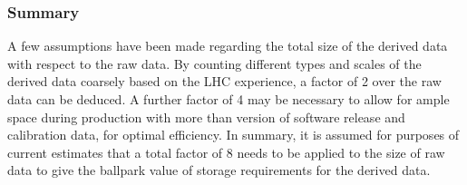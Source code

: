 \subsubsection{Summary}
\label{sec:derived-data-factor}
A few assumptions have been made regarding the total size of the derived data with respect to the raw data. By counting
different types and scales of the derived data coarsely based on the LHC experience, a factor of 2 over the raw data can
be deduced. A further factor of 4 may be necessary to allow for ample space during production with more than version
of software release and calibration data, for optimal efficiency. In summary, it is assumed for purposes of current estimates
that a total factor of 8 needs to be applied to the size of raw data to give the ballpark value of storage requirements for
the derived data.

